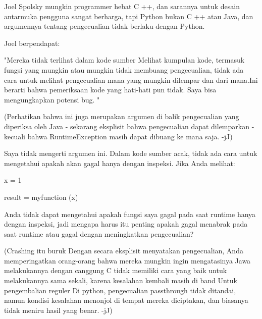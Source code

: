 \documentclass[a4paper,12pt]{report}
\begin{document}
\noindent 
Joel Spolsky mungkin programmer hebat C ++, dan sarannya untuk desain antarmuka pengguna sangat berharga, tapi Python bukan C ++ atau Java, dan argumennya tentang pengecualian tidak berlaku dengan Python. \par
\noindent 
\vspace{12pt}
\noindent 
Joel berpendapat: \par
\noindent 
\vspace{12pt}
\noindent 
"Mereka tidak terlihat dalam kode sumber Melihat kumpulan kode, termasuk fungsi yang mungkin atau mungkin tidak membuang pengecualian, tidak ada cara untuk melihat pengecualian mana yang mungkin dilempar dan dari mana.Ini berarti bahwa pemeriksaan kode yang hati-hati pun tidak. Saya bisa mengungkapkan potensi bug. " \par
\noindent 
\vspace{12pt}
\noindent 
(Perhatikan bahwa ini juga merupakan argumen di balik pengecualian yang diperiksa oleh Java - sekarang eksplisit bahwa pengecualian dapat dilemparkan - kecuali bahwa RuntimeException masih dapat dibuang ke mana saja. -jJ) \par
\noindent 
\vspace{12pt}
\noindent 
Saya tidak mengerti argumen ini. Dalam kode sumber acak, tidak ada cara untuk mengetahui apakah akan gagal hanya dengan inspeksi. Jika Anda melihat: \par
\noindent 
\vspace{12pt}
\noindent 
x = 1 \par
\noindent 
result = myfunction (x) \par
\vspace{20pt}
\noindent 
Anda tidak dapat mengetahui apakah fungsi saya gagal pada saat runtime hanya dengan inspeksi, jadi mengapa harus itu penting apakah gagal menabrak pada saat runtime atau gagal dengan meningkatkan pengecualian? \par
\noindent 
\vspace{12pt}
\noindent 
(Crashing itu buruk Dengan secara eksplisit menyatakan pengecualian, Anda memperingatkan orang-orang bahwa mereka mungkin ingin mengatasinya Jawa melakukannya dengan canggung C tidak memiliki cara yang baik untuk melakukannya sama sekali, karena kesalahan kembali masih di band Untuk pengembalian reguler Di python, pengecualian passthrough tidak ditandai, namun kondisi kesalahan menonjol di tempat mereka diciptakan, dan biasanya tidak meniru hasil yang benar. -jJ) \par
\noindent 
\vspace{12pt}
\end{document}
